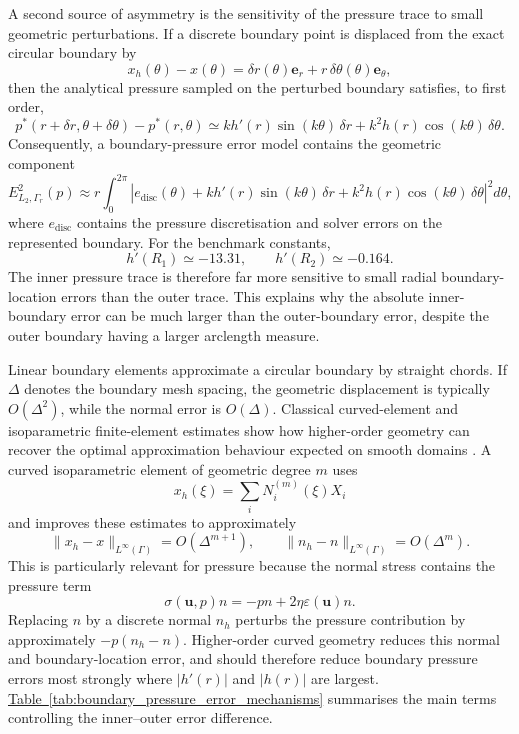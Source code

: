 \documentclass[gmd, manuscript]{copernicus}
\newcommand{\tabref}[1]{\hyperref[#1]{Table~\ref*{#1}}}
\begin{document}
A second source of asymmetry is the sensitivity of the pressure trace to small
geometric perturbations. If a discrete boundary point is displaced from the
exact circular boundary by
\[
  x_h(\theta)-x(\theta)
  =
  \delta r(\theta)\mathbf{e}_r
  +
  r\,\delta\theta(\theta)\mathbf{e}_\theta,
\]
then the analytical pressure sampled on the perturbed boundary satisfies, to
first order,
\begin{equation}
  p^*(r+\delta r,\theta+\delta\theta)-p^*(r,\theta)
  \simeq
  k h'(r)\sin(k\theta)\,\delta r
  +
  k^2 h(r)\cos(k\theta)\,\delta\theta .
\end{equation}
Consequently, a boundary-pressure error model contains the geometric component
\begin{equation}
  E_{L_2,\Gamma_r}^2(p)
  \approx
  r\int_0^{2\pi}
  \left|
    e_{\mathrm{disc}}(\theta)
    +
    k h'(r)\sin(k\theta)\,\delta r
    +
    k^2 h(r)\cos(k\theta)\,\delta\theta
  \right|^2 d\theta ,
\end{equation}
where \(e_{\mathrm{disc}}\) contains the pressure discretisation and solver
errors on the represented boundary. For the benchmark constants,
\[
  h'(R_1)\simeq -13.31,
  \qquad
  h'(R_2)\simeq -0.164 .
\]
The inner pressure trace is therefore far more sensitive to small radial
boundary-location errors than the outer trace. This explains why the absolute
inner-boundary error can be much larger than the outer-boundary error, despite
the outer boundary having a larger arclength measure.

Linear boundary elements approximate a circular boundary by straight chords. If
\(\Delta\) denotes the boundary mesh spacing, the geometric displacement is
typically \(O(\Delta^2)\), while the normal error is \(O(\Delta)\). Classical
curved-element and isoparametric finite-element estimates show how higher-order
geometry can recover the optimal approximation behaviour expected on smooth
domains \citep{Ciarlet_1972,Lenoir_1986,Bernardi_1989}. A curved isoparametric
element of geometric degree \(m\) uses
\begin{equation}
  x_h(\xi)=\sum_i N_i^{(m)}(\xi)X_i
\end{equation}
and improves these estimates to approximately
\begin{equation}
  \|x_h-x\|_{L^\infty(\Gamma)}=O(\Delta^{m+1}),
  \qquad
  \|n_h-n\|_{L^\infty(\Gamma)}=O(\Delta^m).
\end{equation}
This is particularly relevant for pressure because the normal stress contains
the pressure term
\begin{equation}
  \sigma(\mathbf{u},p)n
  =
  -p n + 2\eta \varepsilon(\mathbf{u})n .
\end{equation}
Replacing \(n\) by a discrete normal \(n_h\) perturbs the pressure contribution
by approximately \(-p(n_h-n)\). Higher-order curved geometry reduces this
normal and boundary-location error, and should therefore reduce boundary
pressure errors most strongly where \(|h'(r)|\) and \(|h(r)|\) are largest.
\tabref{tab:boundary_pressure_error_mechanisms} summarises the main terms
controlling the inner--outer error difference.
\end{document}

